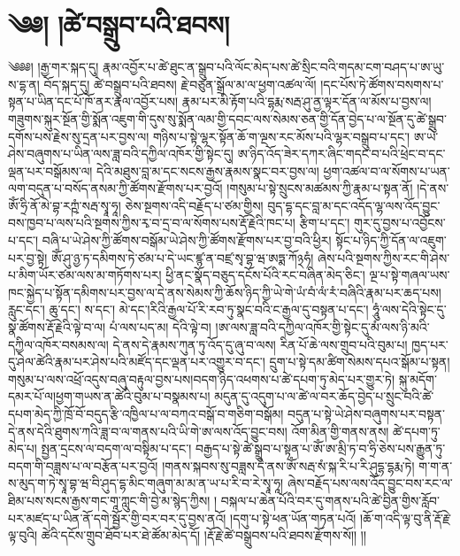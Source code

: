 \setcounter{footnote}{0} 
\chapter{༄༅། །ཚེ་བསྒྲུབ་པའི་ཐབས།}༄༅༅། །རྒྱ་གར་སྐད་དུ། རྣམ་འབྱོར་པ་ཚེ་ཐུང་ན་སྒྲུབ་པའི་ལོང་མེད་པས་ཚེ་སྲིང་བའི་གདམ་ངག་བཤད་པ་ཨ་ཡུ་ས་དྷ་ན། བོད་སྐད་དུ། ཚེ་བསྒྲུབ་པའི་ཐབས། རྗེ་བཙུན་སྒྲོལ་མ་ལ་ཕྱག་འཚལ་ལོ། །དང་པོས་ཏེ་ཚོགས་བསགས་པ་སྟན་པ་ཡིན་དང་པོ་ཁོ་ནར་རྣལ་འབྱོར་པས། རྣམ་པར་མི་རྟོག་པའི་དྷརྨ་སརྦ་ཤུ་ནྱ་ལྟར་དོན་ལ་མོས་པ་བྱས་ལ།གཟུགས་སྐུར་སྔོན་གྱི་སྨོན་འཇུག་གི་དུས་སུ་སྨོན་ལམ་གྱི་དབང་ལས་སེམས་ཅན་གྱི་དོན་བྱེད་པ་ལ་སྔོན་དུ་ཚེ་སྒྲུབ་དགོས་པས་རྗེས་སུ་དྲན་པར་བྱས་ལ། གཉིས་པ་སྟེ་ལྷར་སྟོན་ཆོ་ག་ལྔས་རང་མོས་པའི་ལྷར་བསྒྲུབ་པ་དང་། ཨ་ཡེ་ཤེས་བཞུགས་པ་ཡིན་ལས་ཟླ་བའི་དཀྱིལ་འཁོར་གྱི་སྟེང་དུ། ཨ་ཉིད་འོད་ཟེར་དཀར་ཞིང་གདང་བ་པའི་ཕྲེང་བ་དང་ལྡན་པར་བསྒོམས་ལ། དེའི་མཐུས་བླ་མ་དང་སངས་རྒྱས་རྣམས་སྣང་བར་བྱས་ལ། ཕྱག་འཚལ་བ་ལ་སོགས་པ་ཡན་ལག་བདུན་པ་བསོད་ནསམ་ཀྱི་ཚོགས་རྫོགས་པར་བྱའོ། །གསུམ་པ་སྟེ་སྲུངས་མཚམས་ཀྱི་རྣམ་པ་སྟན་ནོ། །དེ་ནས་ཨོཾ་ཧྲི་ནོ་མེ་བྷ་རཀྵཾ་སརྦ་སྭཱ་ཧཱ། ཅེས་སྔགས་འདི་བརྗོད་པ་ཙམ་གྱིས། བུད་དྷ་དང་བླ་མ་དང་འདོད་ལྷ་ལས་འོད་བྱུང་བས་ཁྱབ་པ་ལས་པའི་སྔགས་ཀྱིས་རྭ་བ་དྲ་བ་ལ་སོགས་པས་རྡོ་རྗེའི་ཁང་པ། རྩིག་པ་དང་། གུར་དུ་བྱས་པ་འབྱོངས་པ་དང་། བཞི་པ་ཡེ་ཤེས་ཀྱི་ཚོགས་བསྒོམ་ཡེ་ཤེས་ཀྱི་ཚོགས་རྫོགས་པར་བྱ་བའི་ཕྱིར། སྟོང་པ་ཉིད་ཀྱི་དོན་ལ་འཇུག་པར་བྱ་སྟེ། ཨོཾ་ཤུ་ཉྱ་ཏ་དམིགས་ཏེ་ཙམ་པ་དེ་ཡང་ཛྙ་ན་བཛྲ་སྭ་བྷ་ཝ་ཨཏྨ་ཀོ྅ཧཾ། ཞེས་པའི་སྔགས་ཀྱིས་རང་གི་ཤེས་པ་མིག་ཡོར་ཙམ་ལས་མ་གཏོགས་པར། ཕྱི་ནང་སྣོད་བཅུད་དངོས་པོའི་རང་བཞིན་མེད་ཅིང་། ལྔ་པ་སྟེ་གཞལ་ཡས་ཁང་སྐྱེད་པ་སྟོན་དམིགས་པར་བྱས་ལ་དེ་ནས་སེམས་ཀྱི་ཆོས་ཉིད་ཀྱི་ཡེ་གེ་ཡཾ་བཾ་ལཾ་རཾ་བཞིའི་རྣམ་པར་ཆད་པས། རླུང་དང་། ཆུ་དང་། ས་དང་། མེ་དང་།རིའི་རྒྱལ་པོ་རི་རབ་ཏུ་སྣང་བའི་ང་རྒྱལ་དུ་བསྟན་པ་དང་། ཧཱུཾ་ལས་དེའི་སྟེང་དུ་སྣ་ཚོགས་རྡོ་རྗེའི་ལྟེ་བ་ལ། པཾ་ལས་པད་མ། དེའི་ལྟེ་བ། །ཨ་ལས་ཟླ་བའི་དཀྱིལ་འཁོར་གྱི་སྟེང་དུ་མཾ་ལས་ཉི་མའི་དཀྱིལ་འཁོར་བསམས་ལ། དེ་ནས་དེ་རྣམས་ཀུན་ཏུ་འོད་དུ་ཞུ་བ་ལས། རིན་པོ་ཆེ་ལས་གྲུབ་པའི་བུམ་པ། ཁྱད་པར་དུ་ཤེལ་ཚེའི་རྣམ་པར་ཤེས་པའི་མཛོད་དང་ལྡན་པར་འགྱུར་བ་དང་། དྲུག་པ་སྟེ་དམ་ཚིག་སེམས་དཔའ་སྒོམ་པ་སྟན། གསུམ་པ་ལས་འཕྲོ་འདུས་བཞུ་བརྟུལ་བྱས་པས།བདག་ཉིད་འཕགས་པ་ཚེ་དཔག་ཏུ་མེད་པར་གྱུར་ཏེ། སྐུ་མདོག་དམར་པོ་ལ།ཕྱག་གཡས་ན་ཚེའི་བུམ་པ་བསྣམས་པ། མདུན་དུ་འདུག་པ་ལ་ཚེ་ལ་བར་ཆོད་བྱེད་པ་སྲུང་བའི་ཚེ་དཔག་མེད་ཀྱི་ཁྲོ་བོ་བདུད་རྩི་འཁྱིལ་པ་ལ་བཀའ་བསྒོ་བ་གཅིག་བསྒོམ། བདུན་པ་སྟེ་ཡེ་ཤེས་བཞུགས་པར་བསྟན་དེ་ནས་དེའི་ཐུགས་ཀའི་ཟླ་བ་ལ་གནས་པའི་ཡི་གེ་ཨ་ལས་འོད་བྱུང་བས། འོག་མིན་གྱི་གནས་ནས། ཚེ་དཔག་ཏུ་མེད་པ། སྤྱན་དྲངས་ལ་བདག་ལ་བསྟིམ་པ་དང་། བརྒྱད་པ་སྟེ་ཚེ་སྒྲུབ་པ་སྟན་པ་ཨོཾ་ཨ་མྲི་ཏ་བ་ཧྲི་ཅེས་པས་རྒྱུན་ཏུ་བདག་གི་བཟླས་པ་ལ་བརྩོན་པར་བྱའོ། །གནས་སྐབས་སུ་བཟླས་དེ་ནས་ཨོཾ་སརྦ་སཾ་སྐ་རི་པ་རི་ཤུདྷ་དྷརྨ་ཏེ། ག་ག་ན་ས་མུད་ག་ཏེ་སྭཱ་བྷ་ཝ་བི་ཤུད་དྷ་མིང་གཞུག་མ་མ་ན་ཡ་པ་རི་བ་རེ་སྭཱ་ཧཱ། ཞེས་བརྗོད་པས་ལས་འོད་བྱུང་བས་རང་ལ་ཐིམ་པས་སངས་རྒྱས་གང་གཱ་ཀླུང་གི་བྱེ་མ་སྙེད་ཀྱིས། ། བསྐལ་པ་ཆེན་པོའི་བར་དུ་གནས་པའི་ཚེ་བྱིན་གྱིས་རློབ་པར་མཛད་པ་ཡིན་ནོ་དགེ་སྦྱོར་གྱི་བར་བར་དུ་བྱས་ནའོ། །དགུ་པ་སྟེ་ཕན་ཡོན་གཏན་པའོ། །ཆོ་ག་འདི་ལྟ་བུ་ནི་རྡོ་རྗེ་ལྟ་བུའི། ཚེའི་དངོས་གྲུབ་ཐོབ་པར་ཐེ་ཚོམ་མེད་དོ། །རྡོ་རྗེ་ཚེ་བསྒྲུབས་པའི་ཐབས་རྫོགས་སོ།། །།